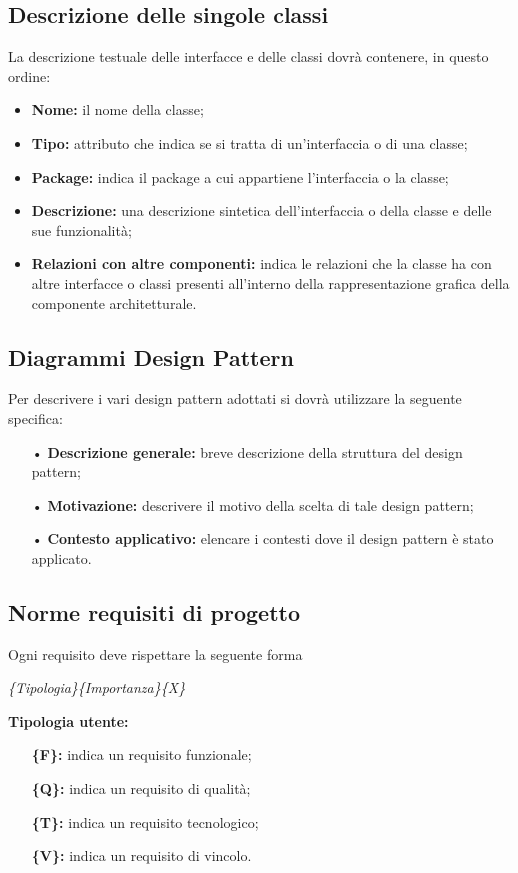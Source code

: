 {	\subsection{Descrizione delle singole classi}{
La descrizione testuale delle interfacce e delle classi dovrà contenere, in questo ordine:
\begin{itemize}
\item \textbf{Nome:} il nome della classe;
\item \textbf{Tipo:} attributo che indica se si tratta di un'interfaccia o di una classe;
\item \textbf{Package:} indica il package a cui appartiene l'interfaccia o la classe;
\item \textbf{Descrizione:} una descrizione sintetica dell'interfaccia o della classe e delle sue funzionalità;
\item \textbf{Relazioni con altre componenti:} indica le relazioni che la classe ha con altre interfacce o classi presenti all'interno della rappresentazione grafica della componente architetturale.
\end{itemize}

}
	\subsection{Diagrammi Design Pattern} {
		Per descrivere i vari design pattern adottati si dovrà utilizzare la seguente specifica:
		\begin{itemize}
			\item[•] {\textbf{Descrizione generale:} breve descrizione della struttura del design pattern;}
			\item[•] {\textbf{Motivazione:} descrivere il motivo della scelta di tale design pattern;}
			\item[•] {\textbf{Contesto applicativo:} elencare i contesti dove il design pattern è stato applicato.}
		\end{itemize}
	}

	\subsection{Norme requisiti di progetto} {
		Ogni requisito deve rispettare la seguente forma 
		\begin{center}
			\textit{\{Tipologia\}\{Importanza\}\{X\}} 
		\end{center}
		
		\textbf{Tipologia utente:}
		\begin{itemize}
			\item []\textbf {\{F\}:} indica un requisito funzionale;
			\item []\textbf {\{Q\}:} indica un requisito di qualità;
			\item []\textbf {\{T\}:} indica un requisito tecnologico;
			\item []\textbf {\{V\}:} indica un requisito di vincolo.
		\end{itemize}
		
}}
